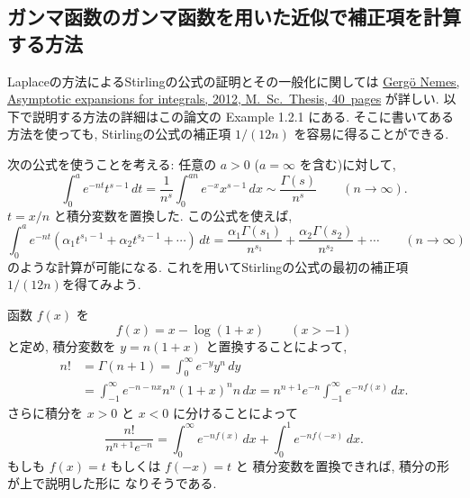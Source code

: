 \documentclass[12pt,twoside]{jarticle}
\theoremstyle{jplain}
\theoremstyle{jplain}
\theoremstyle{jplain}
\numberwithin{theorem}{section}
\numberwithin{equation}{section}
\numberwithin{figure}{section}
\numberwithin{table}{section}
\begin{document}
\subsection{ガンマ函数のガンマ函数を用いた近似で補正項を計算する方法}

Laplaceの方法によるStirlingの公式の証明とその一般化に関しては
\href{https://www.cs.elte.hu/blobs/diplomamunkak/msc_mat/2012/nemes_gergo.pdf}
{Gerg\"o Nemes, Asymptotic expansions for integrals, 2012, M.~Sc.~Thesis, 40~pages}
が詳しい. 以下で説明する方法の詳細はこの論文の Example 1.2.1 にある.
そこに書いてある方法を使っても, 
Stirlingの公式の補正項 $1/(12n)$ を容易に得ることができる.

次の公式を使うことを考える: 任意の $a>0$ ($a=\infty$ を含む)に対して, 
\[
\int_0^a e^{-nt} t^{s-1}\,dt 
= \frac{1}{n^s}\int_0^{an} e^{-x} x^{s-1}\,dx
\sim
\frac{\Gamma(s)}{n^s}
\qquad (n\to\infty).
\]
$t=x/n$ と積分変数を置換した. この公式を使えば, 
\[
\int_0^a e^{-nt} (\alpha_1 t^{s_1-1} + \alpha_2 t^{s_2-1} + \cdots)\,dt
=
\frac{\alpha_1\Gamma(s_1)}{n^{s_1}} + \frac{\alpha_2\Gamma(s_2)}{n^{s_2}} + \cdots
\qquad (n\to\infty)
\]
のような計算が可能になる.
これを用いてStirlingの公式の最初の補正項 $1/(12n)$を得てみよう.

函数 $f(x)$ を
\[
f(x) = x-\log(1+x) \qquad (x>-1)
\]
と定め, 積分変数を $y=n(1+x)$ と置換することによって,
\begin{align*}
n! 
&= \Gamma(n+1) 
= \int_0^\infty e^{-y} y^n\,dy
\\ &
= \int_{-1}^\infty e^{-n-nx}n^n(1+x)^n n\,dx
= n^{n+1}e^{-n}\int_{-1}^\infty e^{-nf(x)}\,dx.
\end{align*}
さらに積分を $x>0$ と $x<0$ に分けることによって
\[
\frac{n!}{n^{n+1}e^{-n}}
= \int_0^\infty e^{-nf(x)}\,dx + \int_0^1 e^{-nf(-x)}\,dx.
\]
もしも $f(x)=t$ もしくは $f(-x)=t$ と
積分変数を置換できれば, 積分の形が上で説明した形に
なりそうである.
\end{document}
